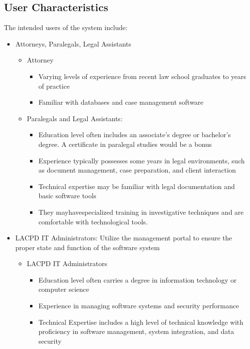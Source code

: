 \documentclass[12pt]{article}
\begin{document}
\subsection{User Characteristics} 
The intended users of the system include:
\begin{itemize}
  \item Attorneys, Paralegals, Legal Assistants
	\begin{itemize}
	\item     Attorney
		\begin{itemize}
		\item    Varying levels of experience from recent law school graduates to years of practice
		\item  Familiar with databases and case management software
		\end{itemize}
	\item  Paralegals and Legal Assistants:
		\begin{itemize}
		\item     Education level often includes an associate's degree or bachelor's degree. A certificate in paralegal studies would be a bonus
		\item Experience typically possesses some years in legal environments, such as document management, case preparation, and client interaction
		\item  Technical expertise may be familiar with legal documentation and basic software tools
		\item They mayhavespecialized training in investigative techniques and are comfortable with technological tools.
		\end{itemize}
	\end{itemize}
  \item LACPD IT Administrators: Utilize the management portal to ensure the proper state and
 function of the software system
	\begin{itemize}
	\item      LACPD IT Administrators
		\begin{itemize}
		\item     Education level often carries a degree in information technology or computer science
		\item Experience in managing software systems and security performance
		\item Technical Expertise includes a high level of technical knowledge with proficiency in software management, system integration, and data security
		\end{itemize}
	\end{itemize}
\end{itemize}
\end{document}
